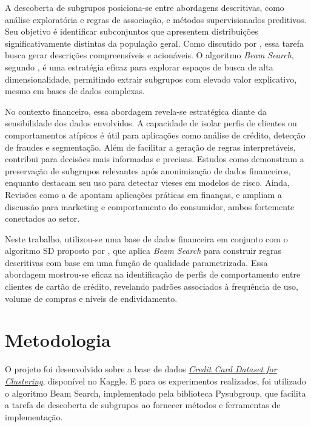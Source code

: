 \documentclass[12pt]{article}
\begin{document}
A descoberta de subgrupos posiciona-se entre abordagens descritivas, como análise exploratória e regras de associação, e métodos supervisionados preditivos. Seu objetivo é identificar subconjuntos que apresentem distribuições significativamente distintas da população geral. Como discutido por \cite{gamberger:02}, essa tarefa busca gerar descrições compreensíveis e acionáveis. O algoritmo \textit{Beam Search}, segundo \cite{atzmueller:15}, é uma estratégia eficaz para explorar espaços de busca de alta dimensionalidade, permitindo extrair subgrupos com elevado valor explicativo, mesmo em bases de dados complexas.

No contexto financeiro, essa abordagem revela-se estratégica diante da sensibilidade dos dados envolvidos. A capacidade de isolar perfis de clientes ou comportamentos atípicos é útil para aplicações como análise de crédito, detecção de fraudes e segmentação. Além de facilitar a geração de regras interpretáveis, contribui para decisões mais informadas e precisas. Estudos como \cite{maina:19} demonstram a preservação de subgrupos relevantes após anonimização de dados financeiros, enquanto \cite{dubowski:21} destacam seu uso para detectar vieses em modelos de risco. Ainda, Revisões como a de \cite{helal:16} apontam aplicações práticas em finanças, e \cite{herrera:10} ampliam a discussão para marketing e comportamento do consumidor, ambos fortemente conectados ao setor.

Neste trabalho, utilizou-se uma base de dados financeira em conjunto com o algoritmo SD proposto por \cite{gamberger:02}, que aplica \textit{Beam Search} para construir regras descritivas com base em uma função de qualidade parametrizada. Essa abordagem mostrou-se eficaz na identificação de perfis de comportamento entre clientes de cartão de crédito, revelando padrões associados à frequência de uso, volume de compras e níveis de endividamento.

\section{Metodologia}

\hspace{1.2cm}O projeto foi desenvolvido sobre a base de dados \href{https://www.kaggle.com/datasets/arjunbhasin2013/ccdata/data}{\textit{Credit Card Dataset for Clustering}}, disponível no Kaggle. E para os experimentos realizados, foi utilizado o algoritmo Beam Search, implementado pela biblioteca Pysubgroup, que facilita a tarefa de descoberta de subgrupos ao fornecer métodos e ferramentas de implementação.
\end{document}
